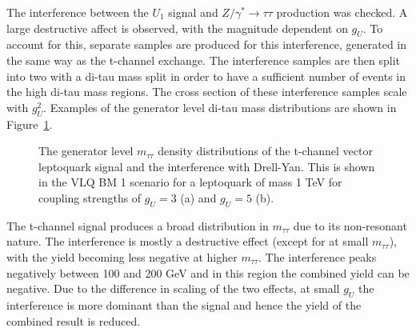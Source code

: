 The interference between the $U_1$ signal and $Z/\gamma^* \rightarrow \tau\tau$ production was checked.
A large destructive affect is observed, with the magnitude dependent on $g_{U}$.
To account for this, separate samples are produced for this interference, generated in the same way as the t-channel exchange.
The interference samples are then split into two with a di-tau mass split in order to have a sufficient number of events in the high di-tau mass regions.
The cross section of these interference samples scale with $g_{U}^2$. 
Examples of the generator level di-tau mass distributions are shown in Figure~\ref{fig:vlq_signal}. \\

\begin{figure}[!hbtp]
\centering
\caption{The generator level $m_{\tau\tau}$ density distributions of the t-channel vector leptoquark signal and the interference with Drell-Yan. This is shown in the VLQ BM 1 scenario for a leptoquark of mass 1 TeV for coupling strengths of $g_{U}=3$ (a) and $g_{U}=5$ (b).}
\label{fig:vlq_signal}
\end{figure}

The t-channel signal produces a broad distribution in $m_{\tau\tau}$ due to its non-resonant nature.
The interference is mostly a destructive effect (except for at small $m_{\tau\tau}$), with the yield becoming less negative at higher $m_{\tau\tau}$.
The interference peaks negatively between 100 and 200 GeV and in this region the combined yield can be negative.
Due to the difference in scaling of the two effects, at small $g_{U}$ the interference is more dominant than the signal and hence the yield of the combined result is reduced.

